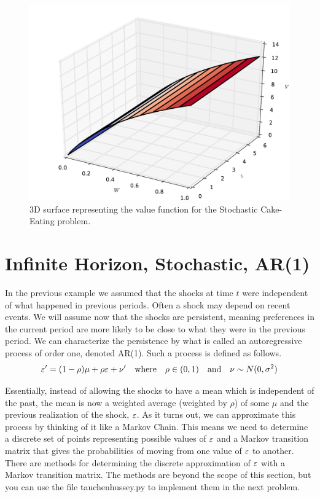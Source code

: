 \begin{figure}
    \centering
    \includegraphics[width = \textwidth]{stoch_value.pdf}
    \caption{3D surface representing the value function for the Stochastic Cake-Eating problem.}
\end{figure}

\section*{Infinite Horizon, Stochastic, AR(1)}\label{SecRecProbInfinHorStochAR1}

In the previous example we assumed that the shocks at time $t$ were independent of what happened in previous periods.  Often a shock may depend on recent events.  We will assume now that the shocks are persistent, meaning preferences in the current period are more likely to be close to what they were in the previous period.  We can characterize the persistence by what is called an autoregressive process of order one, denoted AR(1).  Such a process is defined as follows.
\begin{equation}\label{EqAR1shock}
   \varepsilon' = (1-\rho)\mu + \rho\varepsilon + \nu' \quad\text{where}\quad \rho\in(0,1) \quad\text{and}\quad \nu\sim N(0,\sigma^2)
\end{equation}

Essentially, instead of allowing the shocks to have a mean which is independent of the past, the mean is now a weighted average (weighted by $\rho$) of some $\mu$ and the previous realization of the shock, $\varepsilon$.  As it turns out, we can approximate this process by thinking of it like a Markov Chain. This means we need to determine a discrete set of points representing possible values of $\varepsilon$ and a Markov transition matrix that gives the probabilities of moving from one value of $\varepsilon$ to another.  There are methods for determining the discrete approximation of $\varepsilon$ with a Markov transition matrix.  The methods are beyond the scope of this section, but you can use the file tauchenhussey.py to implement them in the next problem.

